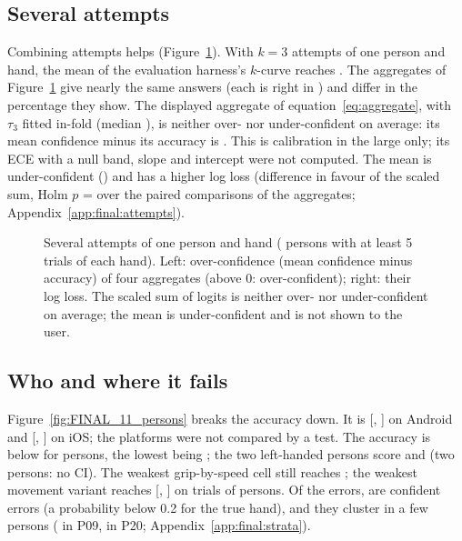 \subsection{Several attempts}\label{sec:results:attempts}
Combining attempts helps (Figure~\ref{fig:FINAL_10_attempts}). With $k = 3$ attempts of one person and hand, the
mean \pright{} of the evaluation harness's $k$-curve reaches . The aggregates of
Figure~\ref{fig:FINAL_10_attempts} give nearly the same answers (each is right in ) and
differ in the percentage they show. The displayed aggregate of equation~\eqref{eq:aggregate}, with $\tau_3$ fitted
in-fold (median ), is neither over- nor under-confident on average: its mean confidence minus its
accuracy is . This is calibration in the large only; its ECE with a null band, slope
and intercept were not computed. The mean \pright{} is under-confident () and has a
higher log loss (difference  in favour of the scaled sum, Holm $p$ =
 over the paired comparisons of the aggregates; Appendix~\ref{app:final:attempts}).

\begin{figure}[htbp]
\centering
{}
\caption{Several attempts of one person and hand ( persons with at least 5 trials of each
hand). Left: over-confidence (mean confidence minus accuracy) of four aggregates (above 0: over-confident); right:
their log loss. The scaled sum of logits is neither over- nor under-confident on average; the mean \pright{} is
under-confident and is not shown to the user.}
\label{fig:FINAL_10_attempts}
\end{figure}

\subsection{Who and where it fails}\label{sec:results:failures}
Figure~\ref{fig:FINAL_11_persons} breaks the accuracy down. It is 
[, ] on Android and 
[, ] on iOS; the platforms were not compared by a test. The accuracy is
below  for  persons, the lowest being ; the
two left-handed persons score  and  (two persons: no CI). The weakest
grip-by-speed cell still reaches ; the weakest movement variant reaches
 [, ] on
 trials of  persons. Of the  errors,
 are confident errors (a probability below 0.2 for the true hand), and they cluster in a few
persons ( in P09,  in P20; Appendix~\ref{app:final:strata}).


